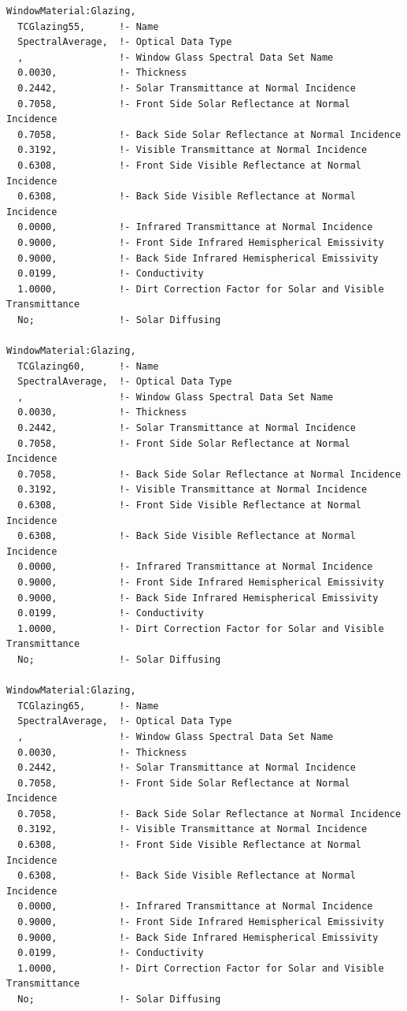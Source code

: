 \begin{lstlisting}
WindowMaterial:Glazing,
  TCGlazing55,      !- Name
  SpectralAverage,  !- Optical Data Type
  ,                 !- Window Glass Spectral Data Set Name
  0.0030,           !- Thickness
  0.2442,           !- Solar Transmittance at Normal Incidence
  0.7058,           !- Front Side Solar Reflectance at Normal Incidence
  0.7058,           !- Back Side Solar Reflectance at Normal Incidence
  0.3192,           !- Visible Transmittance at Normal Incidence
  0.6308,           !- Front Side Visible Reflectance at Normal Incidence
  0.6308,           !- Back Side Visible Reflectance at Normal Incidence
  0.0000,           !- Infrared Transmittance at Normal Incidence
  0.9000,           !- Front Side Infrared Hemispherical Emissivity
  0.9000,           !- Back Side Infrared Hemispherical Emissivity
  0.0199,           !- Conductivity
  1.0000,           !- Dirt Correction Factor for Solar and Visible Transmittance
  No;               !- Solar Diffusing

WindowMaterial:Glazing,
  TCGlazing60,      !- Name
  SpectralAverage,  !- Optical Data Type
  ,                 !- Window Glass Spectral Data Set Name
  0.0030,           !- Thickness
  0.2442,           !- Solar Transmittance at Normal Incidence
  0.7058,           !- Front Side Solar Reflectance at Normal Incidence
  0.7058,           !- Back Side Solar Reflectance at Normal Incidence
  0.3192,           !- Visible Transmittance at Normal Incidence
  0.6308,           !- Front Side Visible Reflectance at Normal Incidence
  0.6308,           !- Back Side Visible Reflectance at Normal Incidence
  0.0000,           !- Infrared Transmittance at Normal Incidence
  0.9000,           !- Front Side Infrared Hemispherical Emissivity
  0.9000,           !- Back Side Infrared Hemispherical Emissivity
  0.0199,           !- Conductivity
  1.0000,           !- Dirt Correction Factor for Solar and Visible Transmittance
  No;               !- Solar Diffusing

WindowMaterial:Glazing,
  TCGlazing65,      !- Name
  SpectralAverage,  !- Optical Data Type
  ,                 !- Window Glass Spectral Data Set Name
  0.0030,           !- Thickness
  0.2442,           !- Solar Transmittance at Normal Incidence
  0.7058,           !- Front Side Solar Reflectance at Normal Incidence
  0.7058,           !- Back Side Solar Reflectance at Normal Incidence
  0.3192,           !- Visible Transmittance at Normal Incidence
  0.6308,           !- Front Side Visible Reflectance at Normal Incidence
  0.6308,           !- Back Side Visible Reflectance at Normal Incidence
  0.0000,           !- Infrared Transmittance at Normal Incidence
  0.9000,           !- Front Side Infrared Hemispherical Emissivity
  0.9000,           !- Back Side Infrared Hemispherical Emissivity
  0.0199,           !- Conductivity
  1.0000,           !- Dirt Correction Factor for Solar and Visible Transmittance
  No;               !- Solar Diffusing


\end{lstlisting}
